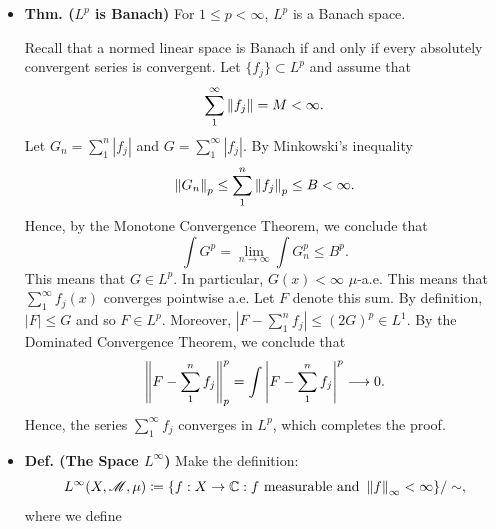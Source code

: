 \documentclass{article}
\begin{document}
\begin{itemize}
\begin{solutions}
\begin{equation}
		\end{equation}
	\end{solutions}  
	Note that Minkowski's inequality implies that $\norm{\empspace}_{p}$ is a norm for all $1 \leq p$. On the other hand, one can show that $\norm{\empspace}_{p}$ is concave for all $0 < p < 1$ so that it is definitely not a norm for these $L^{p}$ spaces. 
	\item \textbf{Thm. ($L^{p}$ is Banach)} For $1 \leq p < \infty$, $L^{p}$ is a Banach space. \newline 
	\begin{solutions}
		Recall that a normed linear space is Banach if and only if every absolutely convergent series is convergent. Let $\{f_{j}\} \subset L^{p}$ and assume that 
			\begin{equation}
				\sum_{1}^{\infty}\left\Vert f_{j} \right\Vert = M < \infty. 
			\end{equation}
		Let $G_{n} = \sum_{1}^{n}|f_{j}|$ and $G = \sum_{1}^{\infty}|f_{j}|$. By Minkowski's inequality 
			\begin{equation}
				\left\Vert G_{n} \right\Vert_{p}\leq \sum_{1}^{n}\left\Vert f_{j} \right\Vert_{p} \leq B < \infty. 
			\end{equation}
		Hence, by the Monotone Convergence Theorem, we conclude that 
			\begin{equation}
				\int G^{p} = \lim_{n \to\infty}\int G_{n}^{p} \leq B^{p}. 
			\end{equation}
		This means that $G \in L^{p}$. In particular, $G(x) < \infty$ $\mu$-a.e. This means that $\sum_{1}^{\infty}f_{j}(x)$ converges pointwise a.e. Let $F$ denote this sum. By definition, $|F| \leq G$ and so $F \in L^{p}$. Moreover, $|F - \sum_{1}^{n}f_{j}| \leq (2G)^{p} \in L^{1}$. By the Dominated Convergence Theorem, we conclude that 
			\begin{equation}
				\left\Vert F - \sum_{1}^{n}f_{j} \right\Vert_{p}^{p} = \int \left| F - \sum_{1}^{n}f_{j} \right|^{p} \longrightarrow 0. 
			\end{equation}
		Hence, the series $\sum_{1}^{\infty}f_{j}$ converges in $L^{p}$, which completes the proof. 
	\end{solutions}
	\item \textbf{Def. (The Space $L^{\infty}$)} Make the definition: 
	\begin{equation}
		L^{\infty}(X, \mathscr{M}, \mu) \coloneqq \brac*{f: X \to \mathbb{C}: f \text{ measurable and } \norm{f}_{\infty} < \infty}/\sim, 
	\end{equation}
	where we define 
		\begin{equation}

\end{equation}
\end{itemize}
\end{document}
